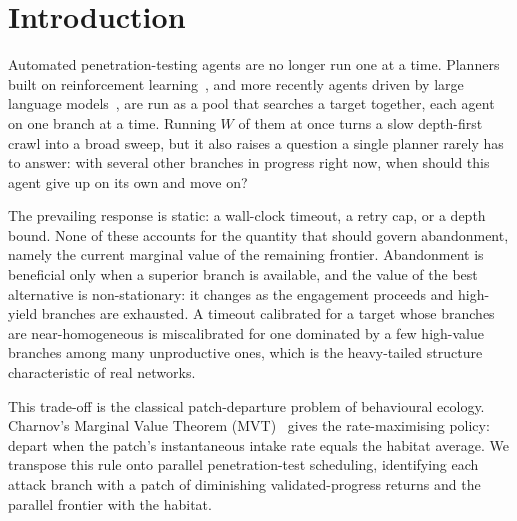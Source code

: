 \documentclass[runningheads]{llncs}
\begin{document}
\section{Introduction}
\label{sec:intro}

Automated penetration-testing agents are no longer run one at a time. Planners built
on reinforcement learning~\cite{schwartz2019autonomous,hu2020automated}, and more
recently agents driven by large language models~\cite{deng2024pentestgpt}, are run as
a pool that searches a target together, each agent on one branch at a time. Running $W$ of them at once turns a slow depth-first crawl into a broad sweep,
but it also raises a
question a single planner rarely has to answer: with several other branches in
progress right now, when should this agent give up on its own and move on?

The prevailing response is static: a wall-clock timeout, a retry cap, or a depth bound.
None of these accounts for the quantity that should govern abandonment, namely the
current marginal value of the remaining frontier. Abandonment is beneficial only when a
superior branch is available, and the value of the best alternative is non-stationary:
it changes as the engagement proceeds and high-yield branches are exhausted. A timeout
calibrated for a target whose branches are near-homogeneous is miscalibrated for one
dominated by a few high-value branches among many unproductive ones, which is the
heavy-tailed structure characteristic of real networks.

This trade-off is the classical patch-departure problem of behavioural ecology. Charnov's Marginal Value Theorem (MVT)~\cite{charnov1976optimal} gives the
rate-maximising policy: depart when the patch's instantaneous intake rate equals the
habitat average. We transpose this rule onto parallel penetration-test scheduling,
identifying each attack branch with a patch of diminishing validated-progress returns
and the parallel frontier with the habitat.
\end{document}
